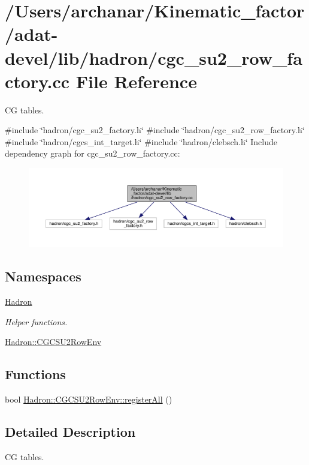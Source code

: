 \hypertarget{adat-devel_2lib_2hadron_2cgc__su2__row__factory_8cc}{}\section{/\+Users/archanar/\+Kinematic\+\_\+factor/adat-\/devel/lib/hadron/cgc\+\_\+su2\+\_\+row\+\_\+factory.cc File Reference}
\label{adat-devel_2lib_2hadron_2cgc__su2__row__factory_8cc}


CG tables.  


{\ttfamily \#include \char`\"{}hadron/cgc\+\_\+su2\+\_\+factory.\+h\char`\"{}}\newline
{\ttfamily \#include \char`\"{}hadron/cgc\+\_\+su2\+\_\+row\+\_\+factory.\+h\char`\"{}}\newline
{\ttfamily \#include \char`\"{}hadron/cgcs\+\_\+int\+\_\+target.\+h\char`\"{}}\newline
{\ttfamily \#include \char`\"{}hadron/clebsch.\+h\char`\"{}}\newline
Include dependency graph for cgc\+\_\+su2\+\_\+row\+\_\+factory.\+cc\+:
\nopagebreak
\begin{figure}[H]
\begin{center}
\leavevmode
\includegraphics[width=350pt]{dd/d4a/adat-devel_2lib_2hadron_2cgc__su2__row__factory_8cc__incl}
\end{center}
\end{figure}
\subsection*{Namespaces}
\begin{DoxyCompactItemize}
\item 
 \mbox{\hyperlink{namespaceHadron}{Hadron}}
\begin{DoxyCompactList}\small\item\em Helper functions. \end{DoxyCompactList}\item 
 \mbox{\hyperlink{namespaceHadron_1_1CGCSU2RowEnv}{Hadron\+::\+C\+G\+C\+S\+U2\+Row\+Env}}
\end{DoxyCompactItemize}
\subsection*{Functions}
\begin{DoxyCompactItemize}
\item 
bool \mbox{\hyperlink{namespaceHadron_1_1CGCSU2RowEnv_a613b8fd4057061e97fd9c03d53dfc4e8}{Hadron\+::\+C\+G\+C\+S\+U2\+Row\+Env\+::register\+All}} ()
\end{DoxyCompactItemize}


\subsection{Detailed Description}
CG tables. 

